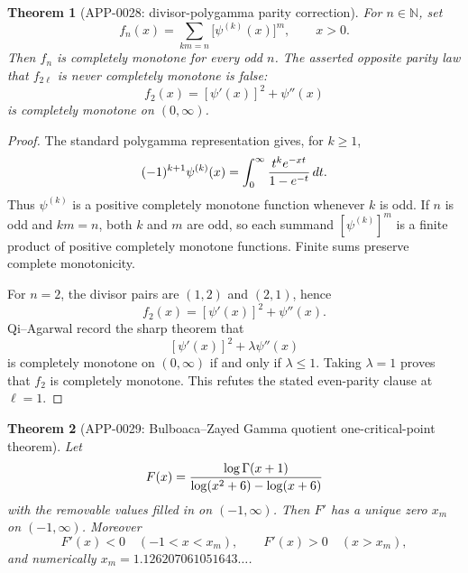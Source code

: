 \documentclass[11pt]{article}
\numberwithin{equation}{section}
\newtheorem{theorem}{Theorem}[section]
\theoremstyle{definition}
\theoremstyle{remark}
\newcommand{\1}{\mathbf 1}
\begin{document}
\begin{theorem}[APP-0028: divisor-polygamma parity correction]
\label{thm:app28-qa-divisor-polygamma}
For \(n\in\mathbb N\), set
\[
 f_n(x)=\sum_{km=n}\bigl[\psi^{(k)}(x)\bigr]^m,\qquad x>0.
\]
Then \(f_n\) is completely monotone for every odd \(n\).  The asserted
opposite parity law that \(f_{2\ell}\) is never completely monotone is false:
\[
 f_2(x)=[\psi'(x)]^2+\psi''(x)
\]
is completely monotone on \((0,\infty)\).
\end{theorem}

\begin{proof}
The standard polygamma representation gives, for \(k\ge1\),
\[
 (-1)^{k+1}\psi^{(k)}(x)
 =\int_0^\infty {t^ke^{-xt}\over1-e^{-t}}\,dt .
\]
Thus \(\psi^{(k)}\) is a positive completely monotone function whenever
\(k\) is odd.  If \(n\) is odd and \(km=n\), both \(k\) and \(m\) are odd, so
each summand \([\psi^{(k)}]^m\) is a finite product of positive completely
monotone functions.  Finite sums preserve complete monotonicity.

For \(n=2\), the divisor pairs are \((1,2)\) and \((2,1)\), hence
\[
 f_2(x)=[\psi'(x)]^2+\psi''(x).
\]
Qi--Agarwal record the sharp theorem that
\[
 [\psi'(x)]^2+\lambda\psi''(x)
\]
is completely monotone on \((0,\infty)\) if and only if \(\lambda\le1\).
Taking \(\lambda=1\) proves that \(f_2\) is completely monotone.  This refutes
the stated even-parity clause at \(\ell=1\).
\end{proof}

\begin{theorem}[APP-0029: Bulboaca--Zayed Gamma quotient one-critical-point theorem]
\label{thm:app29-bz-gamma-quotient}
Let
\[
 F(x)=
 {\log\Gamma(x+1)\over \log(x^2+6)-\log(x+6)}
\]
with the removable values filled in on \((-1,\infty)\).  Then \(F'\) has a
unique zero \(x_m\) on \((-1,\infty)\).  Moreover
\[
 F'(x)<0\quad(-1<x<x_m),\qquad
 F'(x)>0\quad(x>x_m),
\]
and numerically \(x_m=1.126207061051643\ldots\).
\end{theorem}
\end{document}

